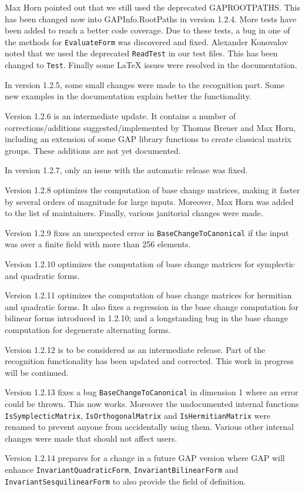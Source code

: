 \documentclass[a4paper,11pt]{report}
\begin{document}
{{Max Horn pointed out that we still used the deprecated
GAP{\textunderscore}ROOT{\textunderscore}PATHS. This has been changed now into
GAPInfo.RootPaths in version 1.2.4. More tests have been added to reach a
better code coverage. Due to these tests, a bug in one of the methods for \texttt{EvaluateForm} was discovered and fixed. Alexander Konovalov noted that we used the
deprecated \texttt{ReadTest} in our test files. This has been changed to \texttt{Test}. Finally some LaTeX issues were resolved in the documentation. 

In version 1.2.5, some small changes were made to the recognition part. Some
new examples in the documentation explain better the functionality. 

Version 1.2.6 is an intermediate update. It contains a number of
corrections/additions suggested/implemented by Thomas Breuer and Max Horn,
including an extension of some GAP library functions to create classical
matrix groups. These additions are not yet documented. 

In version 1.2.7, only an issue with the automatic release was fixed. 

Version 1.2.8 optimizes the computation of base change matrices, making it
faster by several orders of magnitude for large inputs. Moreover, Max Horn was
added to the list of maintainers. Finally, various janitorial changes were
made. 

Version 1.2.9 fixes an unexpected error in \texttt{BaseChangeToCanonical} if the input was over a finite field with more than 256 elements. 

Version 1.2.10 optimizes the computation of base change matrices for
symplectic and quadratic forms. 

Version 1.2.11 optimizes the computation of base change matrices for hermitian
and quadratic forms. It also fixes a regression in the base change computation
for bilinear forms introduced in 1.2.10; and a
long\texttt{}standing bug in the base change computation for
degenerate alternating forms. 

Version 1.2.12 is to be considered as an intermediate release. Part of the
recognition functionality has been updated and corrected. This work in
progress will be continued. 

Version 1.2.13 fixes a bug \texttt{BaseChangeToCanonical} in dimension 1 where an error could be thrown. This now works. Moreover the
undocumented internal functions \texttt{IsSymplecticMatrix}, \texttt{IsOrthogonalMatrix} and \texttt{IsHermitianMatrix} were renamed to prevent anyone from accidentally using them. Various other
internal changes were made that should not affect users. 

Version 1.2.14 prepares for a change in a future GAP version where GAP will
enhance \texttt{InvariantQuadraticForm}, \texttt{InvariantBilinearForm} and \texttt{InvariantSesquilinearForm} to also provide the field of definition. }

  }
\end{document}
